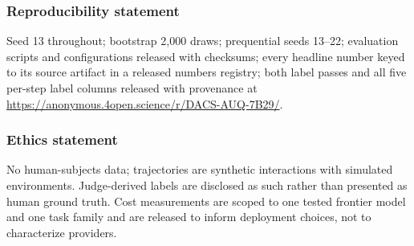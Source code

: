 \documentclass{article}
\begin{document}
\subsubsection*{Reproducibility statement}
Seed 13 throughout; bootstrap 2{,}000 draws; prequential seeds 13--22; evaluation scripts and configurations released with checksums; every
headline number keyed to its source artifact in a released
numbers registry; both label passes and all five per-step label columns
released with provenance at
\url{https://anonymous.4open.science/r/DACS-AUQ-7B29/}.

\subsubsection*{Ethics statement}
No human-subjects data; trajectories are synthetic interactions with simulated
environments. Judge-derived labels are disclosed as such rather than presented
as human ground truth. Cost measurements are scoped to one tested frontier
model and one task family and are released to inform deployment choices, not
to characterize providers.
\end{document}
